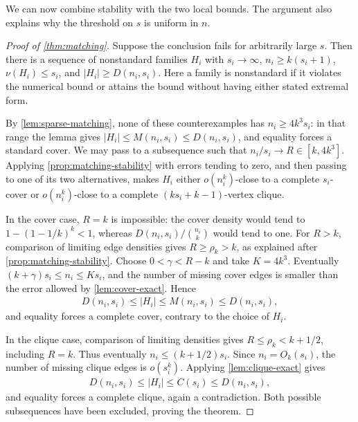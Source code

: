We can now combine stability with the two local bounds. The argument also explains why the threshold on $s$ is uniform in $n$.
\begin{proof}[Proof of \cref{thm:matching}]
Suppose the conclusion fails for arbitrarily large $s$. Then there is a sequence of nonstandard families $H_i$ with $s_i\to\infty$, $n_i\ge k(s_i+1)$, $\nu(H_i)\le s_i$, and $|H_i|\ge D(n_i,s_i)$. Here a family is nonstandard if it violates the numerical bound or attains the bound without having either stated extremal form.

By \cref{lem:sparse-matching}, none of these counterexamples has $n_i\ge4k^3s_i$: in that range the lemma gives $|H_i|\le M(n_i,s_i)\le D(n_i,s_i)$, and equality forces a standard cover. We may pass to a subsequence such that $n_i/s_i\to R\in[k,4k^3]$. Applying \cref{prop:matching-stability} with errors tending to zero, and then passing to one of its two alternatives, makes $H_i$ either $o(n_i^k)$-close to a complete $s_i$-cover or $o(n_i^k)$-close to a complete $(ks_i+k-1)$-vertex clique.

In the cover case, $R=k$ is impossible: the cover density would tend to $1-(1-1/k)^k<1$, whereas $D(n_i,s_i)/\binom{n_i}k$ would tend to one. For $R>k$, comparison of limiting edge densities gives $R\ge\rho_k>k$, as explained after \cref{prop:matching-stability}. Choose $0<\gamma<R-k$ and take $K=4k^3$. Eventually $(k+\gamma)s_i\le n_i\le Ks_i$, and the number of missing cover edges is smaller than the error allowed by \cref{lem:cover-exact}. Hence
\begin{align*}
D(n_i,s_i)\le|H_i|\le M(n_i,s_i)\le D(n_i,s_i),
\end{align*}
and equality forces a complete cover, contrary to the choice of $H_i$.

In the clique case, comparison of limiting densities gives $R\le\rho_k<k+1/2$, including $R=k$. Thus eventually $n_i\le(k+1/2)s_i$. Since $n_i=O_k(s_i)$, the number of missing clique edges is $o(s_i^k)$. Applying \cref{lem:clique-exact} gives
\begin{align*}
D(n_i,s_i)\le|H_i|\le C(s_i)\le D(n_i,s_i),
\end{align*}
and equality forces a complete clique, again a contradiction. Both possible subsequences have been excluded, proving the theorem.
\end{proof}
